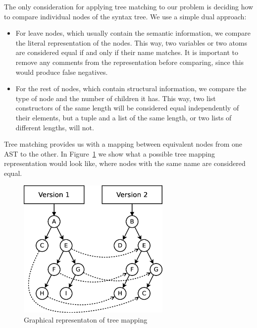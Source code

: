 The only consideration for applying tree matching to our problem is
deciding how to compare individual nodes of the syntax tree. We use
a simple dual approach:
\begin{itemize}
\item For leave nodes, which usually contain the semantic information, we
compare the literal representation of the nodes. This way, two variables
or two atoms are considered equal if and only if their name matches.
It is important to remove any comments from the representation before
comparing, since this would produce false negatives.
\item For the rest of nodes, which contain structural information, we compare
the type of node and the number of children it has. This way, two
list constructors of the same length will be considered equal independently
of their elements, but a tuple and a list of the same length, or two
lists of different lengths, will not.
\end{itemize}
Tree matching provides us with a mapping between equivalent nodes
from one AST to the other. In Figure~\ref{fig:tree-mapping-example}
we show what a possible tree mapping representation would look like,
where nodes with the same name are considered equal.

\begin{figure}
\begin{centering}
\includegraphics[width=0.66\textwidth]{figures/automatic_beh_inf/diagrams/dia2}
\par\end{centering}

\caption{Graphical representaton of tree mapping\label{fig:tree-mapping-example}}
\end{figure}




